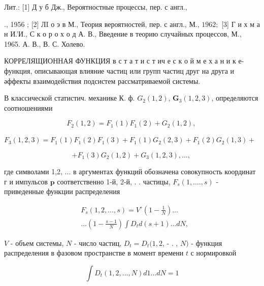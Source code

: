 \documentclass[10pt]{article}
\begin{document}
Лит.: [1] Д у б Дж., Вероятностные процессы, пер. с англ.,

., 1956 ; [2] ЛI о э в М., Теория вероятностей, пер. с англ., М., $1962 ;$ [3] Г и х м а н И.'И., С к о р о х о д А. В., Введение в теорию случайных процессов, М., 1965. А. В., В. С. Холево.



КОРРЕЛЯЩИОННАЯ ФУНКЦИЯ в с т а т и с т ич е с к о й м е х а н и к е- функция, описывающая влияние частиц или групп частиц друг на друга и әффекты взаимодействия подсистем рассматриваемой системы.



В классической статистич. механике К. ф. $G_{2}(1,2)$, $\boldsymbol{G}_{3}(1,2,3)$, определяются соотношениями



\[

F_{2}(1,2)=F_{1}(1) F_{1}(2)+G_{2}(1,2) \text {, }

\]



$F_{3}(1,2,3)=F_{1}(1) F_{1}(2) F_{1}(3)+F_{1}(1) G_{2}(2,3)+F_{1}(2) G_{2}(1,3)+$



\[

+F_{1}(3) G_{2}(1,2)+G_{3}(1,2,3), \ldots \text {, }

\]



где символами 1,2, ... в аргументах функций обозначена совокупность координат г и импульсов $\boldsymbol{p}$ соответственно 1-й, 2-й, . . частицы, $F_{s}(1, \ldots ., s)$ - приведенные функции распределения



\[

\begin{aligned}

& F_{s}(1,2, \ldots, s)=V^{\circ}\left(1-\frac{1}{N}\right) \ldots \\

& \ldots\left(1-\frac{s-1}{N}\right) \int D_{t} d(s+1) \ldots d N,

\end{aligned}

\]



$V$ - объем системы, $N$ - число частиц, $D_{t}=D_{t}(1,2$, - . , $N)$ - функция распределения в фазовом пространстве в момент времени $t$ с нормировкой



\[

\int D_{t}(1,2, \ldots, N) d 1 \ldots d N=1

\]
\end{document}
